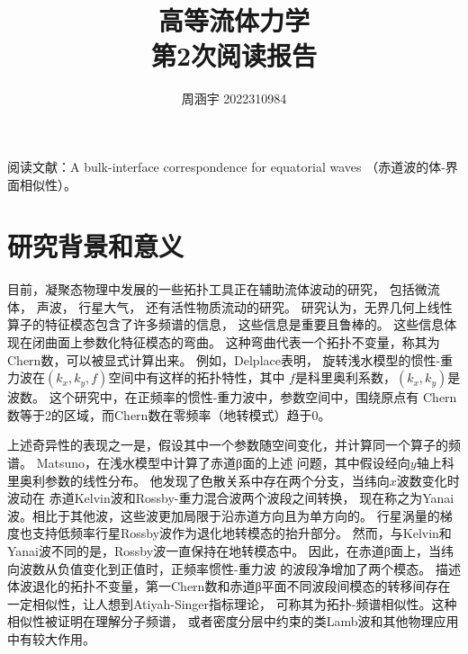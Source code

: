 \documentclass[UTF8,zihao=5]{ctexart} %
\title{{\bfseries\rmfamily\Huge{高等流体力学\hspace{1em}\\第2次阅读报告}}}
\author{周涵宇 2022310984}
\date{}
\begin{document}
\maketitle
\thispagestyle{fancy}



阅读文献：A bulk-interface correspondence for equatorial waves\cite{tauber2019bulk}
（赤道波的体-界面相似性）。


\section{研究背景和意义}

目前，凝聚态物理中发展的一些拓扑工具正在辅助流体波动的研究，
包括微流体\cite{souslov2017topological}，
声波\cite{yang2015topological}，
行星大气\cite{delplace2017topological,vallis2017atmospheric}，
还有活性物质流动\cite{shankar2017topological}的研究。
研究认为，无界几何上线性算子的特征模态包含了许多频谱的信息，
这些信息是重要且鲁棒的。
这些信息体现在闭曲面上参数化特征模态的弯曲。
这种弯曲代表一个拓扑不变量，称其为Chern数，可以被显式计算出来。
例如，Delplace\cite{delplace2017topological}表明，
旋转浅水模型的惯性-重力波在$(k_x,k_y,f)$空间中有这样的拓扑特性，其中
$f$是科里奥利系数，$(k_x,k_y)$是波数。
这个研究中，在正频率的惯性-重力波中，参数空间中，围绕原点有
Chern数等于2的区域，而Chern数在零频率（地转模式）趋于0。

上述奇异性的表现之一是，假设其中一个参数随空间变化，并计算同一个算子的频谱。
Matsuno\cite{matsuno1966quasi}，在浅水模型中计算了赤道β面的上述
问题，其中假设经向$y$轴上科里奥利参数的线性分布。
他发现了色散关系中存在两个分支，当纬向$x$波数变化时波动在
赤道Kelvin波和Rossby-重力混合波两个波段之间转换，
现在称之为Yanai波。相比于其他波，这些波更加局限于沿赤道方向且为单方向的。
行星涡量的梯度也支持低频率行星Rossby波作为退化地转模态的抬升部分。
然而，与Kelvin和Yanai波不同的是，Rossby波一直保持在地转模态中。
因此，在赤道β面上，当纬向波数从负值变化到正值时，正频率惯性-重力波
的波段净增加了两个模态\cite{delplace2017topological}。
描述体波退化的拓扑不变量，第一Chern数和赤道β平面不同波段间模态的转移间存在
一定相似性，让人想到Atiyah-Singer指标理论\cite{bal2019continuous,faure2019manifestation}，
可称其为拓扑-频谱相似性。这种相似性被证明在理解分子频谱\cite{faure2000topological}，
或者密度分层中约束的类Lamb波\cite{perrot2018topological}和其他物理应用
\cite{nakahara2003geometry}中有较大作用。
\end{document}
